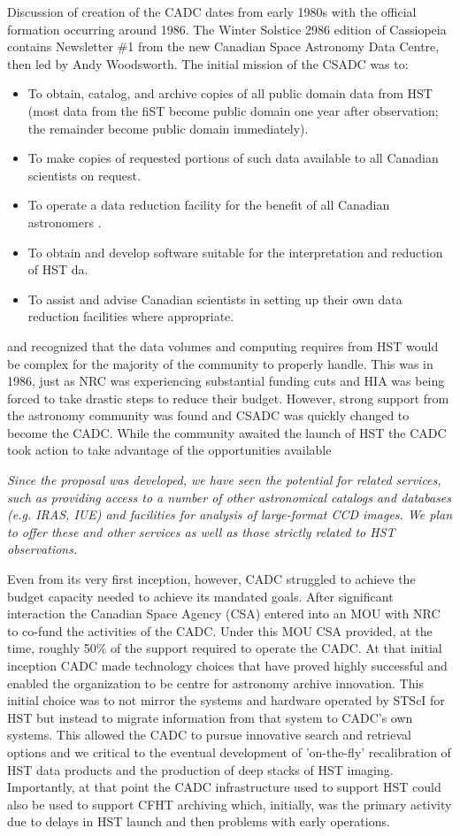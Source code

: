 \documentclass[11pt]{article}
\begin{document}
Discussion of creation of the CADC dates from early 1980s with the official formation occurring around 1986.  The Winter Solstice 2986 edition of Cassiopeia contains Newsletter \#1 from the new Canadian Space Astronomy Data Centre, then led by Andy Woodsworth.  The initial mission of the CSADC was to:
\begin{itemize}
\item To obtain, catalog, and archive copies of all public domain data from HST (most data from the fiST become public domain one year after observation; the remainder become public domain immediately).
\item To make copies of requested portions of such data available to all Canadian scientists on request.
\item To operate a data reduction facility for the benefit of all Canadian astronomers .
\item To obtain and develop software suitable for the interpretation and reduction of HST
da.
\item  To assist and advise Canadian scientists in setting up their own data reduction facilities where appropriate.
\end{itemize}
and recognized that the data volumes and computing requires from HST would be complex for the majority of the community to properly handle.  This was in 1986, just as NRC was experiencing substantial funding cuts and HIA was being forced to take drastic steps to reduce their budget.  However, strong support from the astronomy community was found and CSADC was quickly changed to become the CADC.  While the community awaited the launch of HST the CADC took action to take advantage of the opportunities available 

{\it Since the proposal was developed, we have seen the potential for related services, such as providing access to a number of other astronomical catalogs and databases (e.g. IRAS, IUE) and facilities for analysis of large-format CCD images. We plan to offer these and other services as well as those strictly related to HST observations.}

Even from its very first inception, however, CADC struggled to achieve the budget capacity needed to achieve its mandated goals.  After significant interaction the Canadian Space Agency (CSA) entered into an MOU with NRC to co-fund the activities of the CADC. Under this MOU CSA provided, at the time, roughly 50\% of the support required to operate the CADC.   
At that initial inception CADC made technology choices that have proved highly successful and enabled the organization to be centre for astronomy archive innovation. This initial choice was to not mirror the systems and hardware operated by STScI for HST but instead to migrate information from that system to CADC's own systems. This allowed the CADC to pursue innovative search and retrieval options and we critical to the eventual development of 'on-the-fly' recalibration of HST data products and the production of deep stacks of HST imaging.  Importantly, at that point the CADC infrastructure used to support HST could also be used to support CFHT archiving which, initially, was the primary activity due to delays in HST launch and then problems with early operations. 
\end{document}
